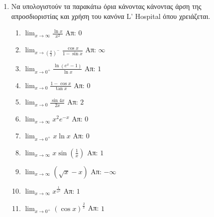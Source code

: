\begin{enumerate}
  \item Να υπολογιστούν τα παρακάτω όρια κάνοντας κάνοντας άρση της απροσδιοριστίας 
    και χρήση του κανόνα L' Hospital όπου χρειάζεται.

    \begin{enumerate}
      \item $\lim_{x\to \infty}\frac{\ln x}{x^2}$ \hfill Απ: $0$
      \item $\lim_{x\to (\frac{\pi}{2})^-}\frac{\cos x}{1-\sin x}$ \hfill Απ: $\infty$
      \item $\lim_{x\to 0^+}\frac{\ln(e^x-1)}{\ln x}$ \hfill Απ: $1$
      \item $\lim_{x\to 0}\frac{1-\cos x }{\tan x}$ \hfill Απ: $0$
      \item $\lim_{x\to 0}\frac{\sin 4x}{2x}$ \hfill Απ: $2$
      \item $\lim_{x\to \infty}x^2e^{-x}$ \hfill Απ: $0$
      \item $\lim_{x\to 0^+}x\ln x$ \hfill Απ: $0$
      \item $\lim_{x\to \infty}x\sin(\frac{1}{x})$ \hfill Απ: $1$
      \item $\lim_{x\to \infty}(\sqrt{x} - x)$ \hfill Απ: $-\infty$
      \item $\lim_{x\to \infty}x^{\frac{1}{x^2}}$ \hfill Απ: $1$
      \item $\lim_{x\to 0^+}(\cos x)^{\frac{2}{x}}$ \hfill Απ: $1$
    \end{enumerate}
\end{enumerate}



